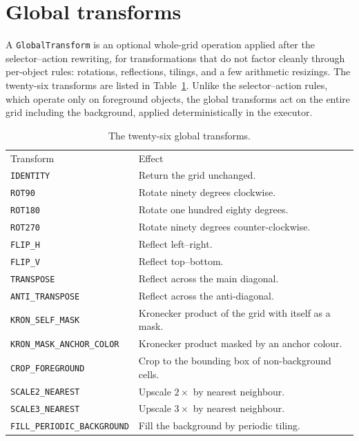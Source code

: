 \section{Global transforms}
\label{app:globals}

A \texttt{GlobalTransform} is an optional whole-grid operation applied after the
selector--action rewriting, for transformations that do not factor cleanly through
per-object rules: rotations, reflections, tilings, and a few arithmetic
resizings. The twenty-six transforms are listed in Table~\ref{tab:app-globals}. Unlike the
selector--action rules, which operate only on foreground objects, the global transforms
act on the entire grid including the background, applied deterministically in the executor.

\begin{table}[htbp]
\centering
\caption{The twenty-six global transforms.}
\label{tab:app-globals}
\small
\begin{tabular}{p{5.4cm}p{7.6cm}}
\hline\noalign{\smallskip}
Transform & Effect \\
\noalign{\smallskip}\hline\noalign{\smallskip}
\texttt{IDENTITY} & Return the grid unchanged. \\
\texttt{ROT90} & Rotate ninety degrees clockwise. \\
\texttt{ROT180} & Rotate one hundred eighty degrees. \\
\texttt{ROT270} & Rotate ninety degrees counter-clockwise. \\
\texttt{FLIP\_H} & Reflect left--right. \\
\texttt{FLIP\_V} & Reflect top--bottom. \\
\texttt{TRANSPOSE} & Reflect across the main diagonal. \\
\texttt{ANTI\_TRANSPOSE} & Reflect across the anti-diagonal. \\
\texttt{KRON\_SELF\_MASK} & Kronecker product of the grid with itself as a mask. \\
\texttt{KRON\_MASK\_ANCHOR\_COLOR} & Kronecker product masked by an anchor colour. \\
\texttt{CROP\_FOREGROUND} & Crop to the bounding box of non-background cells. \\
\texttt{SCALE2\_NEAREST} & Upscale $2\times$ by nearest neighbour. \\
\texttt{SCALE3\_NEAREST} & Upscale $3\times$ by nearest neighbour. \\
\texttt{FILL\_PERIODIC\_BACKGROUND} & Fill the background by periodic tiling. \\

\end{tabular}
\end{table}
